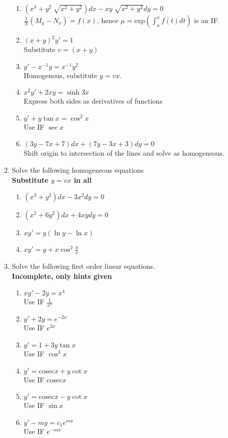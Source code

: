 \documentclass[a4paper]{article}
\begin{document}
\begin{enumerate}
{\begin{enumerate}
{}
\item{$(x^3+y^2\sqrt[]{x^2+y^2})dx-xy\sqrt[]{x^2+y^2}dy=0$
\\$\frac{1}{N}(M_y-N_x)=f(x)$, hence $\mu=$exp$(\int_a ^x f(t) dt)$ is an IF.
}
\item{$(x+y)^2y'=1$
\\Substitute $v=(x+y)$
}
\item{$y'-x^{-1}y=x^{-1}y^2$
\\Homogenous, substitute $y=vx$.
}
\item{$x^2y'+2xy=\sinh 3x$
\\Express both sides as derivatives of functions
}
\item{$y'+y\tan x=\cos^2x$
\\Use IF $\sec x$
}
\item{$(3y-7x+7)dx+(7y-3x+3)dy=0$
\\Shift origin to intersection of the lines and solve as homogeneous.
}
\end{enumerate}
}
\item{Solve the following homogeneous equations
\\\textbf{Substitute $y=vx$ in all}
\begin{enumerate}
\item{$(x^3+y^3)dx-3x^2dy=0$}
\item{$(x^2+6y^2)dx+4xydy=0$}
\item{$xy'=y(\ln y-\ln x)$}
\item{$xy'=y+x\cos^2 \frac{y}{x}$}
\end{enumerate}
}
\item{Solve the following first order linear equations.
\\\textbf{Incomplete, only hints given}
\begin{enumerate} 
\item{$xy'-2y=x^4$
\\Use IF $\frac{1}{x^3}$
}
\item{$y'+2y=e^{-2x}$
\\Use IF $e^{2x}$
}
\item{$y'=1+3y\tan x$
\\Use IF $\cos^3 x$
}
\item{$y' = \mathrm{cosec} x+y\cot x$
\\Use IF $\mathrm{cosec} x$
}
\item{$y'=\mathrm{cosec} x-y\cot x$
\\Use IF $\sin x$
}
\item{$y'-my=c_1e^{mx}$
\\Use IF $e^{-mx}$
}
\end{enumerate}
}
\end{enumerate}
\end{document}
